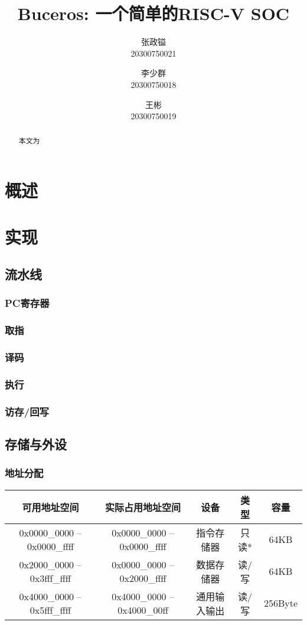 \documentclass[lang=cn,11pt,a4paper,chinesefont=founder]{elegantpaper}
\title{Buceros: 一个简单的RISC-V SOC}
\author{张政镒 \\ 20300750021 \and 李少群 \\ 20300750018 \and 王彬 \\ 20300750019}
\institute{\href{https://github.com/0xtaruhi/Buceros}{Github项目链接}}
\date{\zhtoday}
\begin{document}
\maketitle

\begin{abstract}
    本文为
\end{abstract}

\section{概述}

\section{实现}
\subsection{流水线}
\subsubsection{PC寄存器}

\subsubsection{取指}

\subsubsection{译码}

\subsubsection{执行}

\subsubsection{访存/回写}

\subsection{存储与外设}

\subsubsection{地址分配}
\begin{table}[h!]
    \centering
    \begin{tabular}{ccccc}
        \toprule
        可用地址空间 & 实际占用地址空间 & 设备 & 类型 & 容量\\
        \midrule
        0x0000\_0000 -- 0x0000\_ffff & 0x0000\_0000 -- 0x0000\_ffff & 指令存储器 & 只读* & 64KB\\
        0x2000\_0000 -- 0x3fff\_ffff & 0x0000\_0000 -- 0x2000\_ffff & 数据存储器 & 读/写 & 64KB\\
        0x4000\_0000 -- 0x5fff\_ffff & 0x4000\_0000 -- 0x4000\_00ff & 通用输入输出 & 读/写 & 256Byte\\
        \bottomrule
    \end{tabular}
\end{table}
\end{document}
